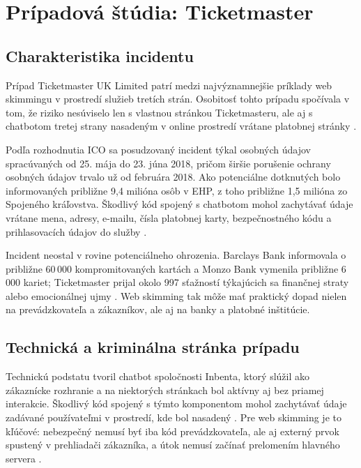 \section{Prípadová štúdia: Ticketmaster}

\subsection{Charakteristika incidentu}

Prípad Ticketmaster UK Limited patrí medzi najvýznamnejšie príklady web skimmingu v prostredí služieb tretích strán. Osobitosť tohto prípadu spočívala v tom, že riziko nesúviselo len s vlastnou stránkou Ticketmasteru, ale aj s chatbotom tretej strany nasadeným v online prostredí vrátane platobnej stránky \cite{ico2020Ticketmaster}.

Podľa rozhodnutia ICO sa posudzovaný incident týkal osobných údajov spracúvaných od 25. mája do 23. júna 2018, pričom širšie porušenie ochrany osobných údajov trvalo už od februára 2018. Ako potenciálne dotknutých bolo informovaných približne 9,4 milióna osôb v EHP, z toho približne 1,5 milióna zo Spojeného kráľovstva. Škodlivý kód spojený s chatbotom mohol zachytávať údaje vrátane mena, adresy, e-mailu, čísla platobnej karty, bezpečnostného kódu a prihlasovacích údajov do služby \cite{ico2020Ticketmaster}.

Incident neostal v rovine potenciálneho ohrozenia. Barclays Bank informovala o približne 60\,000 kompromitovaných kartách a Monzo Bank vymenila približne 6\,000 kariet; Ticketmaster prijal okolo 997 sťažností týkajúcich sa finančnej straty alebo emocionálnej ujmy \cite{ico2020Ticketmaster}. Web skimming tak môže mať praktický dopad nielen na prevádzkovateľa a zákazníkov, ale aj na banky a platobné inštitúcie.

\subsection{Technická a kriminálna stránka prípadu}

Technickú podstatu tvoril chatbot spoločnosti Inbenta, ktorý slúžil ako zákaznícke rozhranie a na niektorých stránkach bol aktívny aj bez priamej interakcie. Škodlivý kód spojený s týmto komponentom mohol zachytávať údaje zadávané používateľmi v prostredí, kde bol nasadený \cite{ico2020Ticketmaster}. Pre web skimming je to kľúčové: nebezpečný nemusí byť iba kód prevádzkovateľa, ale aj externý prvok spustený v prehliadači zákazníka, a útok nemusí začínať prelomením hlavného servera \cite{owaspThirdPartyJavascript}.


